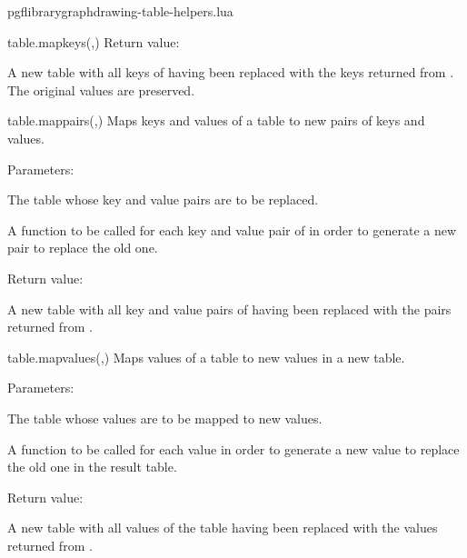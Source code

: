 \begin{filedescription}{pgflibrarygraphdrawing-table-helpers.lua}
\begin{luacommand}{{table.map\textunderscore{}keys}(,)}
Return value:
\begin{parameterdescription} 
  \item[] A new table with all keys of  having been replaced with the keys returned from . The original values are preserved. 
\end{parameterdescription}


\end{luacommand}
\begin{luacommand}{{table.map\textunderscore{}pairs}(,)}
Maps keys and values of a table to new pairs of keys and values. 

Parameters:
\begin{parameterdescription}
	\item[\meta{table}] The table whose key and value pairs are to be replaced.\item[\meta{map\_func}] A function to be called for each key and value pair of  in order to generate a new pair to replace the old one. 
\end{parameterdescription}


Return value:
\begin{parameterdescription} 
  \item[] A new table with all key and value pairs of  having been replaced with the pairs returned from . 
\end{parameterdescription}


\end{luacommand}
\begin{luacommand}{{table.map\textunderscore{}values}(,)}
Maps values of a table to new values in a new table. 

Parameters:
\begin{parameterdescription}
	\item[\meta{input}] The table whose values are to be mapped to new values.\item[\meta{map\_func}] A function to be called for each value in order to generate a new value to replace the old one in the result table. 
\end{parameterdescription}


Return value:
\begin{parameterdescription} 
  \item[] A new table with all values of the  table having been replaced with the values returned from . 
\end{parameterdescription}



\end{luacommand}
\end{filedescription}
